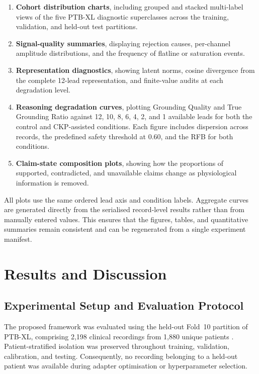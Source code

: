 \documentclass{ssnreview}
\begin{document}
\begin{enumerate}[label=\arabic*.,leftmargin=*,align=left]
  \item \textbf{Cohort distribution charts}, including grouped and stacked multi-label
  views of the five PTB-XL diagnostic superclasses across the training, validation, and
  held-out test partitions.

  \item \textbf{Signal-quality summaries}, displaying rejection causes, per-channel
  amplitude distributions, and the frequency of flatline or saturation events.

  \item \textbf{Representation diagnostics}, showing latent norms, cosine divergence from
  the complete 12-lead representation, and finite-value audits at each degradation level.

  \item \textbf{Reasoning degradation curves}, plotting Grounding Quality and True
  Grounding Ratio against 12, 10, 8, 6, 4, 2, and 1 available leads for both the control
  and CKP-assisted conditions. Each figure includes dispersion across records, the
  predefined safety threshold at 0.60, and the RFB for both conditions.

  \item \textbf{Claim-state composition plots}, showing how the proportions of supported,
  contradicted, and unavailable claims change as physiological information is removed.
\end{enumerate}

All plots use the same ordered lead axis and condition labels. Aggregate curves are
generated directly from the serialised record-level results rather than from manually
entered values. This ensures that the figures, tables, and quantitative summaries remain
consistent and can be regenerated from a single experiment manifest.
  

\chapter{Results and Discussion}

\section{Experimental Setup and Evaluation Protocol}

The proposed framework was evaluated using the held-out Fold~10 partition of PTB-XL,
comprising 2,198 clinical recordings from 1,880 unique patients
\cite{ptbxl2020}. Patient-stratified isolation was preserved throughout training,
validation, calibration, and testing. Consequently, no recording belonging to a held-out
patient was available during adapter optimisation or hyperparameter selection.
\end{document}
